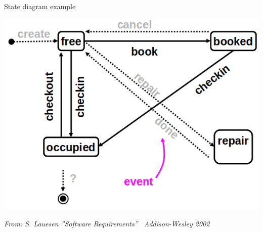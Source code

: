 \begin{Slide}{State diagram example}
\begin{minipage}[t]{0.65\textwidth}
\vspace{0.4em}\includegraphics[width=1.0\textwidth]{../img/state-diagram}
\vspace{-0.4em}
\end{minipage}

{\vspace*{1em}\fontsize{5}{5}\itshape\selectfont From: S. Lauesen ''Software Requirements'' \textcopyright~Addison-Wesley 2002}
\end{Slide}
